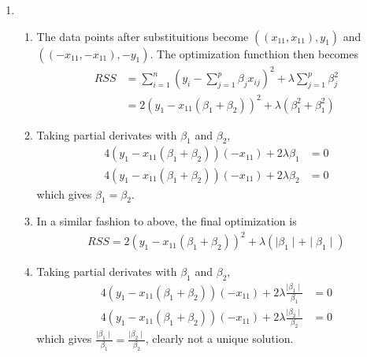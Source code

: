 \documentclass[../statistical_learning_notes.tex]{subfiles}
\begin{document}
\begin{enumerate}
        \item
        \begin{enumerate}
            \item The data points after substituitions become $((x_{11}, x_{11}), y_{1})$ and $((-x_{11}, -x_{11}), -y_{1})$. The optimization functhion then becomes
            \begin{align*}
                RSS &= \sum_{i=1}^{n}(y_{i} - \sum_{j=1}^{p} \beta_{j}x_{ij})^{2} + \lambda \sum_{j=1}^{p}\beta_{j}^{2}\\
                  &= 2(y_{1}-x_{11}(\beta_{1}+\beta_{2}))^{2} + \lambda(\beta_{1}^{2} + \beta_{1}^{2})
            \end{align*}
            \item Taking partial derivates with $\beta_{1}$ and $\beta_{2}$,
            \begin{align*}
                4(y_{1} - x_{11}(\beta_{1} + \beta_{2}))(-x_{11}) + 2\lambda \beta_{1} &= 0\\
                4(y_{1} - x_{11}(\beta_{1} + \beta_{2}))(-x_{11}) + 2\lambda \beta_{2} &= 0
            \end{align*}
            which gives $\beta_{1} = \beta_{2}$.
            \item In a similar fashion to above, the final optimization is
            \begin{align*}
                 RSS = 2(y_{1}-x_{11}(\beta_{1}+\beta_{2}))^{2} + \lambda(\mid \beta_{1} \mid + \mid \beta_{1} \mid)
            \end{align*}
            \item Taking partial derivates with $\beta_{1}$ and $\beta_{2}$,
            \begin{align*}
                4(y_{1} - x_{11}(\beta_{1} + \beta_{2}))(-x_{11}) + 2\lambda \frac{\mid \beta_{1} \mid}{\beta_{1}} &= 0\\
                4(y_{1} - x_{11}(\beta_{1} + \beta_{2}))(-x_{11}) + 2\lambda \frac{\mid \beta_{2} \mid}{\beta_{2}} &= 0
            \end{align*}
            which gives $\frac{\mid \beta_{1} \mid}{\beta_{1}} = \frac{\mid \beta_{2} \mid}{\beta_{2}}$, clearly not a unique solution.
        \end{enumerate}
        

\end{enumerate}
\end{document}
